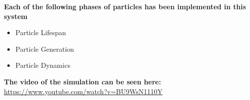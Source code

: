 \documentclass{article}
\begin{document}
\textbf{Each of the following phases of particles has been implemented in this system}
\begin{itemize}
    \item Particle Lifespan
    \item Particle Generation
    \item Particle Dynamics
\end{itemize}

\textbf{The video of the simulation can be seen here: }
\href{https://www.youtube.com/watch?v=BU9WsN1110Y}{https://www.youtube.com/watch?v=BU9WsN1110Y}
\end{document}
